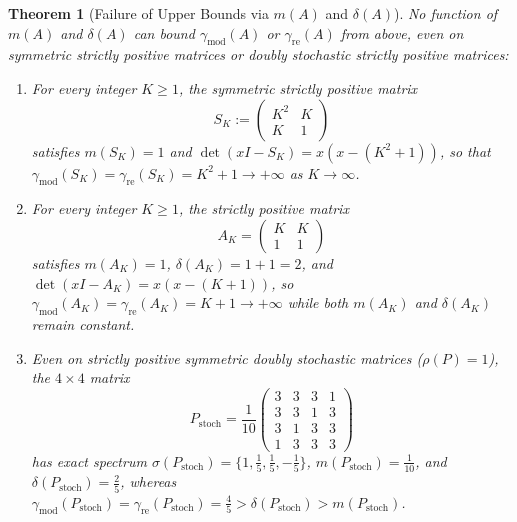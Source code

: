 \documentclass[11pt]{article}
\newtheorem{theorem}{Theorem}[section]
\theoremstyle{definition}
\begin{document}
\begin{theorem}[Failure of Upper Bounds via $m(A)$ and $\delta(A)$]\label{thm:upper}
No function of $m(A)$ and $\delta(A)$ can bound $\gamma_{\mathrm{mod}}(A)$ or $\gamma_{\mathrm{re}}(A)$ from above, even on symmetric strictly positive matrices or doubly stochastic strictly positive matrices:
\begin{enumerate}
  \item[(a)] For every integer $K \ge 1$, the symmetric strictly positive matrix
    \[
      S_K := \begin{pmatrix} K^2 & K \\ K & 1 \end{pmatrix}
    \]
    satisfies $m(S_K) = 1$ and $\det(x I - S_K) = x(x - (K^2 + 1))$, so that $\gamma_{\mathrm{mod}}(S_K) = \gamma_{\mathrm{re}}(S_K) = K^2 + 1 \to +\infty$ as $K \to \infty$.
  \item[(b)] For every integer $K \ge 1$, the strictly positive matrix
    \[
      A_K = \begin{pmatrix} K & K \\ 1 & 1 \end{pmatrix}
    \]
    satisfies $m(A_K) = 1$, $\delta(A_K) = 1 + 1 = 2$, and $\det(x I - A_K) = x(x - (K + 1))$, so $\gamma_{\mathrm{mod}}(A_K) = \gamma_{\mathrm{re}}(A_K) = K + 1 \to +\infty$ while both $m(A_K)$ and $\delta(A_K)$ remain constant.
  \item[(c)] Even on strictly positive symmetric doubly stochastic matrices ($\rho(P) = 1$), the $4 \times 4$ matrix
    \[
      P_{\mathrm{stoch}} = \frac{1}{10}\begin{pmatrix}
        3 & 3 & 3 & 1 \\
        3 & 3 & 1 & 3 \\
        3 & 1 & 3 & 3 \\
        1 & 3 & 3 & 3
      \end{pmatrix}
    \]
    has exact spectrum $\sigma(P_{\mathrm{stoch}}) = \bigl\{1, \tfrac{1}{5}, \tfrac{1}{5}, -\tfrac{1}{5}\bigr\}$, $m(P_{\mathrm{stoch}}) = \tfrac{1}{10}$, and $\delta(P_{\mathrm{stoch}}) = \tfrac{2}{5}$, whereas $\gamma_{\mathrm{mod}}(P_{\mathrm{stoch}}) = \gamma_{\mathrm{re}}(P_{\mathrm{stoch}}) = \tfrac{4}{5} > \delta(P_{\mathrm{stoch}}) > m(P_{\mathrm{stoch}})$.
\end{enumerate}
\end{theorem}
\end{document}
